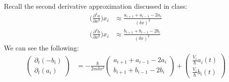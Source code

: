\documentclass[11pt,letterpaper]{article}
\begin{document}
	Recall the second derivative approximation discussed in class:
	\begin{align*}
		\Big( \frac{\partial^2 a}{\partial x^2} \Big) x_i &\approx \frac{a_{i+1}+a_{i-1}-2a_i}{{(\delta x)}^2}\\
		\Big( \frac{\partial^2 b}{\partial x^2} \Big) x_i &\approx \frac{b_{i+1}+b_{i-1}-2b_i}{{(\delta x)}^2}
	\end{align*}
	We can see the following:
	\begin{align*}
		\begin{pmatrix}
			\partial_t (-b_i)\\
			\partial_t (a_i)
		\end{pmatrix}
		&=
		-\frac{\hbar}{2m \delta x^2}
		\begin{pmatrix}
			a_{i+1}+a_{i-1}-2a_i\\
			b_{i+1}+b_{i-1}-2b_i
		\end{pmatrix}
		+
		\begin{pmatrix}
			\frac{V_i}{\hbar} a_i(t)\\
			\frac{V_i}{\hbar} b_i(t)
		\end{pmatrix}
	\end{align*}
\end{document}
